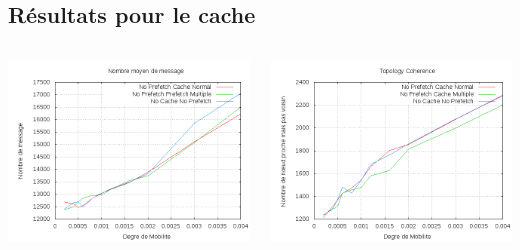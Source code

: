 \documentclass{beamer}
\begin{document}
  \subsection{Résultats pour le cache}
  \begin{frame}
	\begin{columns}
         \begin{column}{5cm}
          \includegraphics[scale=0.25]{./Ressources/Images/Courbes_Final_Rapport/Nombre_Messages_Caches.png}\\
         \end{column}
         \begin{column}{5cm}
          \includegraphics[scale=0.25]{./Ressources/Images/Courbes_Final_Rapport/Topology_Coherence_Caches.png}\\
         \end{column}
        \end{columns}


  \end{frame}
\end{document}
